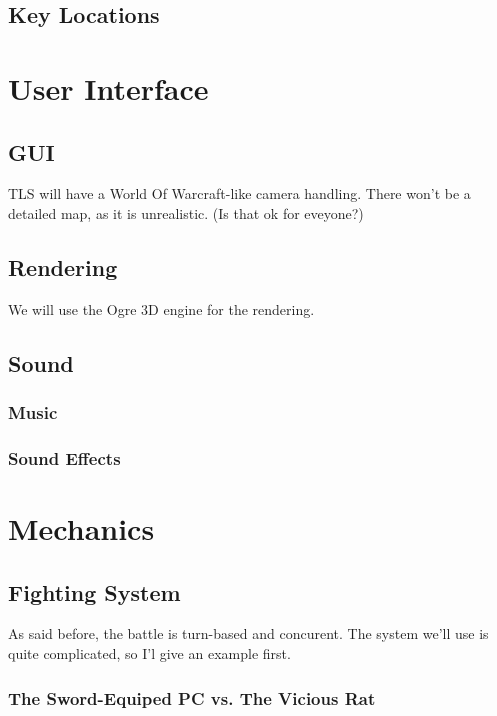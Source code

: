 \documentclass[a4paper]{report}
\begin{document}
	\chapter{Key Locations}

\part{User Interface}

	\chapter{GUI}

		TLS will have a World Of Warcraft-like camera handling. There won't be a detailed map, as it is unrealistic. (Is that ok for eveyone?)

	\chapter{Rendering}

		We will use the Ogre 3D engine for the rendering.

	\chapter{Sound}

		\section{Music}

		\section{Sound Effects}

\part{Mechanics}

	\chapter{Fighting System}

		As said before, the battle is turn-based and concurent. The system  we'll use is quite complicated, so I'l give an example first.

		\section{The Sword-Equiped PC vs. The Vicious Rat}
\end{document}

